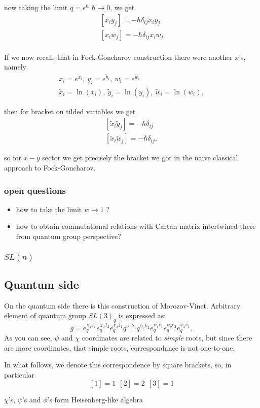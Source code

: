 \documentclass{paper}
\def\be{\begin{eqnarray}}
\def\ee{\end{eqnarray}}
\def\lsb{\left [}
\def\rsb{\right ]}
\def\tx{\tilde{x}}
\def\ty{\tilde{y}}
\def\tw{\tilde{w}}
\begin{document}
now taking the limit $q = e^\hbar$ $\hbar \rightarrow 0$, we get
\be
\lsb x_i y_j \rsb = - \hbar \delta_{ij} x_i y_j \\
\lsb x_i w_j \rsb = - \hbar \delta_{ij} x_i w_j \\
\ee


If we now recall, that in Fock-Goncharov construction there were another $x$'s, namely
\be
x_i = e^{\tx_i},\ y_i = e^{\ty_i},\ w_i = e^{\tw_i} \\
\tx_i = \ln(x_i),\ \ty_i = \ln(y_i),\ \tw_i = \ln(w_i),
\ee

then for bracket on tilded variables we get
\be
\lsb \tx_i \ty_j \rsb = - \hbar \delta_{ij} \\
\lsb \tx_i \tw_j \rsb = - \hbar \delta_{ij},
\ee

so for $x-y$ sector we get precisely the bracket we got in the naive classical approach
to Fock-Goncharov.

\subsubsection{open questions}
\begin{itemize}
\item how to take the limit $w \rightarrow 1$ ?
\item how to obtain commutational relations with Cartan matrix intertwined there from
quantum group perspective?
\end{itemize}

\subsubsection{$SL(n)$}


\subsection{Quantum side}
On the quantum side there is this construction of Morozov-Vinet.
Arbitrary element of quantum group $SL(3)_q$ is expressed as:
$$
g = e_q^{\chi_1 f_1} e_q^{\chi_2 f_2} e_q^{\chi_3 f_1}
q^{\phi_1 h_1} q^{\phi_2 h_2}
e_q^{\psi_1 e_1} e_q^{\psi_2 e_2} e_q^{\psi_3 e_1},
$$
As you can see, $\psi$ and $\chi$ coordinates are related to {\it simple}
roots, but since there are more coordinates, that simple roots,
correspondance is not one-to-one.

In what follows, we denote this correspondence by square brackets, so,
in particular
$$
[1] = 1\ \ [2] = 2\ \ [3] = 1
$$

$\chi$'s, $\psi$'s and $\phi$'s form Heisenberg-like algebra
\end{document}
